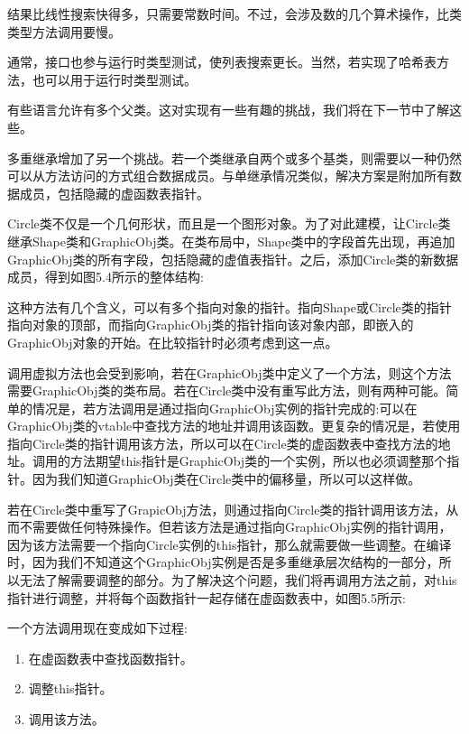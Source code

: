 结果比线性搜索快得多，只需要常数时间。不过，会涉及数的几个算术操作，比类类型方法调用要慢。

通常，接口也参与运行时类型测试，使列表搜索更长。当然，若实现了哈希表方法，也可以用于运行时类型测试。

有些语言允许有多个父类。这对实现有一些有趣的挑战，我们将在下一节中了解这些。


多重继承增加了另一个挑战。若一个类继承自两个或多个基类，则需要以一种仍然可以从方法访问的方式组合数据成员。与单继承情况类似，解决方案是附加所有数据成员，包括隐藏的虚函数表指针。

Circle类不仅是一个几何形状，而且是一个图形对象。为了对此建模，让Circle类继承Shape类和GraphicObj类。在类布局中，Shape类中的字段首先出现，再追加GraphicObj类的所有字段，包括隐藏的虚值表指针。之后，添加Circle类的新数据成员，得到如图5.4所示的整体结构:


这种方法有几个含义，可以有多个指向对象的指针。指向Shape或Circle类的指针指向对象的顶部，而指向GraphicObj类的指针指向该对象内部，即嵌入的GraphicObj对象的开始。在比较指针时必须考虑到这一点。

调用虚拟方法也会受到影响，若在GraphicObj类中定义了一个方法，则这个方法需要GraphicObj类的类布局。若在Circle类中没有重写此方法，则有两种可能。简单的情况是，若方法调用是通过指向GraphicObj实例的指针完成的:可以在GraphicObj类的vtable中查找方法的地址并调用该函数。更复杂的情况是，若使用指向Circle类的指针调用该方法，所以可以在Circle类的虚函数表中查找方法的地址。调用的方法期望this指针是GraphicObj类的一个实例，所以也必须调整那个指针。因为我们知道GraphicObj类在Circle类中的偏移量，所以可以这样做。

若在Circle类中重写了GrapicObj方法，则通过指向Circle类的指针调用该方法，从而不需要做任何特殊操作。但若该方法是通过指向GraphicObj实例的指针调用，因为该方法需要一个指向Circle实例的this指针，那么就需要做一些调整。在编译时，因为我们不知道这个GraphicObj实例是否是多重继承层次结构的一部分，所以无法了解需要调整的部分。为了解决这个问题，我们将再调用方法之前，对this指针进行调整，并将每个函数指针一起存储在虚函数表中，如图5.5所示:


一个方法调用现在变成如下过程:

\begin{enumerate}
\item
在虚函数表中查找函数指针。

\item
调整this指针。

\item
调用该方法。
\end{enumerate}

